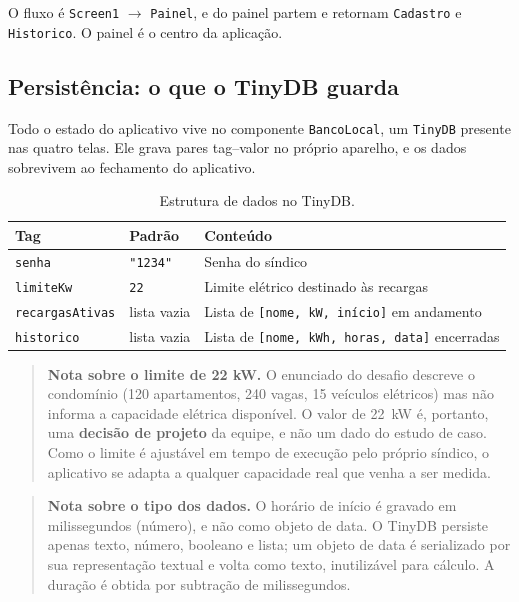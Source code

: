 \documentclass[12pt,a4paper]{article}
\newcommand{\comp}[1]{\texttt{#1}}
\begin{document}
O fluxo é \comp{Screen1} $\rightarrow$ \comp{Painel}, e do painel partem e retornam
\comp{Cadastro} e \comp{Historico}. O painel é o centro da aplicação.

\subsection{Persistência: o que o TinyDB guarda}

Todo o estado do aplicativo vive no componente \comp{BancoLocal}, um \comp{TinyDB} presente
nas quatro telas. Ele grava pares tag--valor no próprio aparelho, e os dados sobrevivem ao
fechamento do aplicativo.

\begin{table}[H]
\centering
\small
\begin{tabular}{@{}llp{7.2cm}@{}}
\toprule
\textbf{Tag} & \textbf{Padrão} & \textbf{Conteúdo} \\
\midrule
\comp{senha}          & \comp{"1234"} & Senha do síndico \\
\comp{limiteKw}       & \comp{22}     & Limite elétrico destinado às recargas \\
\comp{recargasAtivas} & lista vazia   & Lista de \comp{[nome, kW, início]} em andamento \\
\comp{historico}      & lista vazia   & Lista de \comp{[nome, kWh, horas, data]} encerradas \\
\bottomrule
\end{tabular}
\caption{Estrutura de dados no TinyDB.}
\end{table}

\begin{quote}
\small
\textbf{Nota sobre o limite de 22 kW.} O enunciado do desafio descreve o condomínio (120
apartamentos, 240 vagas, 15 veículos elétricos) mas não informa a capacidade elétrica
disponível. O valor de 22~kW é, portanto, uma \textbf{decisão de projeto} da equipe, e não
um dado do estudo de caso. Como o limite é ajustável em tempo de execução pelo próprio
síndico, o aplicativo se adapta a qualquer capacidade real que venha a ser medida.
\end{quote}

\begin{quote}
\small
\textbf{Nota sobre o tipo dos dados.} O horário de início é gravado em milissegundos
(número), e não como objeto de data. O TinyDB persiste apenas texto, número, booleano e
lista; um objeto de data é serializado por sua representação textual e volta como texto,
inutilizável para cálculo. A duração é obtida por subtração de milissegundos.
\end{quote}
\end{document}
